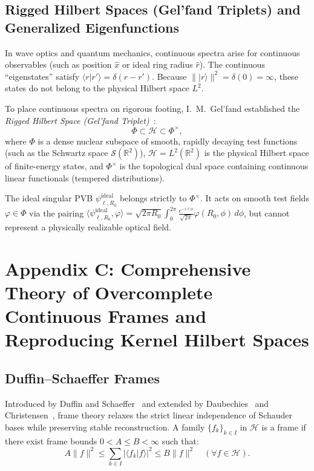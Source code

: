 \documentclass{optica-article}
\begin{document}
\subsection{Rigged Hilbert Spaces (Gel'fand Triplets) and Generalized Eigenfunctions}

In wave optics and quantum mechanics, continuous spectra arise for continuous observables (such as position $\hat{x}$ or ideal ring radius $\hat{r}$). The continuous ``eigenstates'' satisfy $\langle r | r' \rangle = \delta(r - r')$. Because $\||r\rangle\|^2 = \delta(0) = \infty$, these states do not belong to the physical Hilbert space $L^2$.

To place continuous spectra on rigorous footing, I.~M.~Gel'fand established the \emph{Rigged Hilbert Space (Gel'fand Triplet)}~\cite{Gelfand1964,Bohm1989}:
\begin{equation}
\Phi \subset \mathcal{H} \subset \Phi^\times,
\label{eq:app_gelfand_triplet}
\end{equation}
where $\Phi$ is a dense nuclear subspace of smooth, rapidly decaying test functions (such as the Schwartz space $\mathcal{S}(\mathbb{R}^2)$), $\mathcal{H} = L^2(\mathbb{R}^2)$ is the physical Hilbert space of finite-energy states, and $\Phi^\times$ is the topological dual space containing continuous linear functionals (tempered distributions).

The ideal singular PVB $\psi_{\ell, R_0}^{\text{ideal}}$ belongs strictly to $\Phi^\times$. It acts on smooth test fields $\varphi \in \Phi$ via the pairing $\langle \psi_{\ell, R_0}^{\text{ideal}}, \varphi \rangle = \sqrt{2\pi R_0} \int_0^{2\pi} \frac{e^{-i \ell \phi}}{\sqrt{2\pi}} \varphi(R_0, \phi) \, d\phi$, but cannot represent a physically realizable optical field.

\section{Appendix C: Comprehensive Theory of Overcomplete Continuous Frames and Reproducing Kernel Hilbert Spaces}
\label{app:frames}

\subsection{Duffin--Schaeffer Frames}

Introduced by Duffin and Schaeffer~\cite{Duffin1952} and extended by Daubechies~\cite{Daubechies1990} and Christensen~\cite{Christensen2016}, frame theory relaxes the strict linear independence of Schauder bases while preserving stable reconstruction. A family $\{f_k\}_{k \in I}$ in $\mathcal{H}$ is a frame if there exist frame bounds $0 < A \le B < \infty$ such that:
\begin{equation}
A \|f\|^2 \le \sum_{k \in I} |\langle f_k | f \rangle|^2 \le B \|f\|^2 \quad (\forall f \in \mathcal{H}).
\label{eq:app_discrete_frame}
\end{equation}
\end{document}
